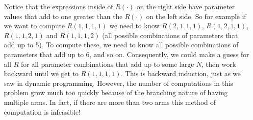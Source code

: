 Notice that the expressions inside of $R(\cdot)$ on the right side have parameter values that add to one greater than the $R(\cdot)$ on the left side.  So for example if we want to compute $R(1,1,1,1)$ we need to know $R(2,1,1,1)$, $R(1,2,1,1)$, $R(1,1,2,1)$ and $R(1,1,1,2)$ (all possible combinations of parameters that add up to 5).  To compute these, we need to know all possible combinations of parameters that add up to 6, and so on.  Consequently, we could make a guess for all $R$ for all parameter combinations that add up to some large $N$, then work backward until we get to $R(1,1,1,1)$.  This is backward induction, just as we saw in dynamic programming.  However, the number of computations in this problem grow much too quickly because of the branching nature of having multiple arms.  In fact, if there are more than two arms this method of computation is infeasible!


